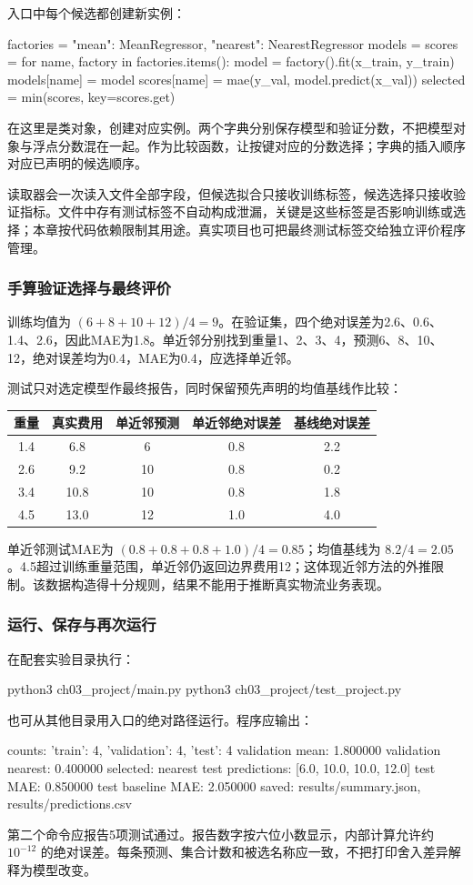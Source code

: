 \documentclass[UTF8,fontset=none,zihao=-4,a4paper]{ctexart}
\newcommand{\code}[1]{\texttt{\detokenize{#1}}}
\numberwithin{equation}{section}
\numberwithin{figure}{section}
\begin{document}
入口中每个候选都创建新实例：
\begin{pycode}
factories = {"mean": MeanRegressor, "nearest": NearestRegressor}
models = {}
scores = {}
for name, factory in factories.items():
    model = factory().fit(x_train, y_train)
    models[name] = model
    scores[name] = mae(y_val, model.predict(x_val))
selected = min(scores, key=scores.get)
\end{pycode}
\code{factory}在这里是类对象，\code{factory()}创建对应实例。两个字典分别保存模型和验证分数，不把模型对象与浮点分数混在一起。\code{scores.get}作为比较函数，让\code{min}按键对应的分数选择；字典的插入顺序对应已声明的候选顺序。

读取器会一次读入文件全部字段，但候选拟合只接收训练标签，候选选择只接收验证指标。文件中存有测试标签不自动构成泄漏，关键是这些标签是否影响训练或选择；本章按代码依赖限制其用途。真实项目也可把最终测试标签交给独立评价程序管理。

\subsubsection{手算验证选择与最终评价}
训练均值为 $(6+8+10+12)/4=9$。在验证集，四个绝对误差为2.6、0.6、1.4、2.6，因此MAE为1.8。单近邻分别找到重量1、2、3、4，预测6、8、10、12，绝对误差均为0.4，MAE为0.4，应选择单近邻。

测试只对选定模型作最终报告，同时保留预先声明的均值基线作比较：
\begin{center}
\begin{tabular}{ccccc}
\toprule
重量 & 真实费用 & 单近邻预测 & 单近邻绝对误差 & 基线绝对误差\\\midrule
1.4 & 6.8 & 6 & 0.8 & 2.2\\
2.6 & 9.2 & 10 & 0.8 & 0.2\\
3.4 & 10.8 & 10 & 0.8 & 1.8\\
4.5 & 13.0 & 12 & 1.0 & 4.0\\\bottomrule
\end{tabular}
\end{center}
单近邻测试MAE为 $(0.8+0.8+0.8+1.0)/4=0.85$；均值基线为 $8.2/4=2.05$。4.5超过训练重量范围，单近邻仍返回边界费用12；这体现近邻方法的外推限制。该数据构造得十分规则，结果不能用于推断真实物流业务表现。

\subsubsection{运行、保存与再次运行}
在配套实验目录执行：
\begin{console}
python3 ch03_project/main.py
python3 ch03_project/test_project.py
\end{console}
也可从其他目录用入口的绝对路径运行。程序应输出：
\begin{console}
counts: {'train': 4, 'validation': 4, 'test': 4}
validation mean: 1.800000
validation nearest: 0.400000
selected: nearest
test predictions: [6.0, 10.0, 10.0, 12.0]
test MAE: 0.850000
test baseline MAE: 2.050000
saved: results/summary.json, results/predictions.csv
\end{console}
第二个命令应报告5项测试通过。报告数字按六位小数显示，内部计算允许约 $10^{-12}$ 的绝对误差。每条预测、集合计数和被选名称应一致，不把打印舍入差异解释为模型改变。
\end{document}
